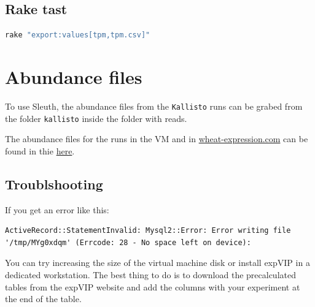 \subsection{Rake tast}\label{rake-tast}

\begin{lstlisting}[language=sh]
rake "export:values[tpm,tpm.csv]"
\end{lstlisting}

\section{Abundance files}\label{abundance-files}

To use Sleuth, the abundance files from the \lstinline!Kallisto! runs
can be grabed from the folder \lstinline!kallisto! inside the folder
with reads.

The abundance files for the runs in the VM and in
\href{http://www.wheat-expression.com}{wheat-expression.com} can be
found in thie
\href{https://www.dropbox.com/sh/dap4eer67qfe9om/AADEyXZ393jY9czjAlArsemma?dl=0}{here}.

\subsection{Troublshooting}\label{troublshooting}

If you get an error like this:

\begin{lstlisting}
ActiveRecord::StatementInvalid: Mysql2::Error: Error writing file '/tmp/MYg0xdqm' (Errcode: 28 - No space left on device):
\end{lstlisting}

You can try increasing the size of the virtual machine disk or install
expVIP in a dedicated workstation. The best thing to do is to download
the precalculated tables from the expVIP website and add the columns
with your experiment at the end of the table.
